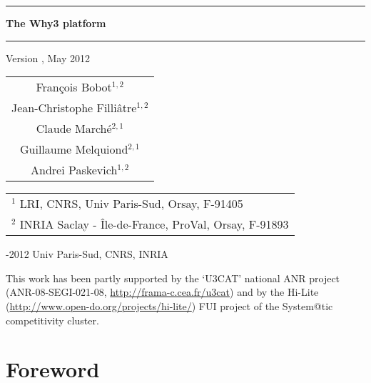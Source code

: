 \documentclass[a4paper,11pt,twoside,openright]{memoir}
\begin{document}
\sloppy
{}

\thispagestyle{empty}

\begin{center}

\rule\textwidth{0.8mm}

\vfill

{\fontsize{40}{40pt}\selectfont\bfseries\sffamily The Why3 platform}

\vfill

\rule\textwidth{0.8mm}

\vfill



\begin{LARGE}
  Version \whyversion{}, May 2012
\end{LARGE}

\vfill

\begin{Large}
  \begin{tabular}{c}
  Fran\c{c}ois Bobot$^{1,2}$ \\
  Jean-Christophe Filli\^atre$^{1,2}$  \\
  Claude March\'e$^{2,1}$ \\
  Guillaume Melquiond$^{2,1}$\\
  Andrei Paskevich$^{1,2}$
\end{tabular}
\end{Large}
\vfill

\begin{flushleft}

\begin{tabular}{l}
$^1$ LRI, CNRS, Univ Paris-Sud, Orsay, F-91405 \\
$^2$ INRIA Saclay - \^Ile-de-France, ProVal, Orsay, F-91893
\end{tabular}

\bigskip

  -2012 Univ Paris-Sud, CNRS, INRIA

  This work has been partly supported by the `U3CAT' national ANR project
  (ANR-08-SEGI-021-08, \url{http://frama-c.cea.fr/u3cat}) and by the
  Hi-Lite (\url{http://www.open-do.org/projects/hi-lite/}) FUI project of the
  System@tic competitivity cluster.

\end{flushleft}
\end{center}

\chapter*{Foreword}
\end{document}
